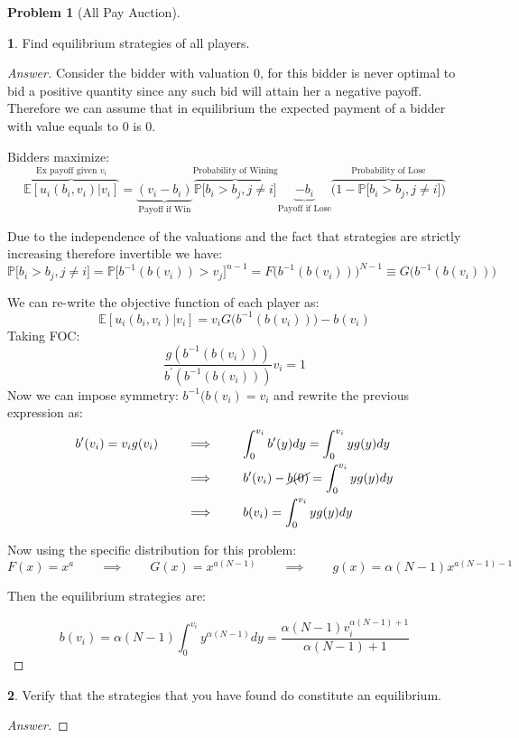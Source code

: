 \documentclass[12pt]{article}
\theoremstyle{definition}
\newtheorem{problem}{Problem}
\newtheorem{subproblem}{}[problem]
\newcommand{\qiq}{\qquad \implies \qquad}
\begin{document}
\begin{problem}[All Pay Auction]
\begin{subproblem}
Find equilibrium strategies of all players.
\end{subproblem}
\begin{proof}[Answer]

Consider the bidder with valuation $0$, for this bidder is never optimal to bid a positive quantity since any such bid will attain her a negative payoff. Therefore we can assume that in equilibrium the expected payment of a bidder with value equals to $0$ is $0$.

Bidders maximize:$$\overbrace{\mathbb{E}[u_i(b_i,v_i)|v_i]}^{\text{Ex payoff given } v_i}=\underbrace{(v_i-b_i)}_{\text{Payoff if Win}} \overbrace{ \mathbb{P}\Big[b_i>b_j, j\neq i\Big]}^{\text{Probability of Wining}}  \underbrace{-b_i}_{\text{Payoff if Lose}} \overbrace{ \Big(1- \mathbb{P}\Big[b_i>b_j, j\neq i\Big]\Big)}^{\text{Probability of Lose}}$$

Due to the independence of the valuations and the fact that strategies are strictly increasing therefore invertible we have:
$$\mathbb{P}\Big[b_i>b_j, j\neq i\Big] = \mathbb{P}\Big[b^{-1}(b(v_i))>v_j\Big]^{n-1} = F\Big(b^{-1}(b(v_i))\Big)^{N-1} \equiv G\Big(b^{-1}(b(v_i))\Big)$$

We can re-write the objective function of each player as:
$$
\mathbb{E}[u_i(b_i,v_i)|v_i]=v_i G\Big(b^{-1}(b(v_i))\Big)- b(v_i)
$$
Taking FOC: 
$$
\frac{g\left(b^{-1}(b(v_i))\right)}{b^{\prime}\left(b^{-1}(b(v_i))\right)}v_i=1
$$
Now we can impose symmetry: $b^{-1}(b(v_i)=v_i$ and rewrite the previous expression as:
\begin{align*}
b'(v_i) = v_ig(v_i) &\qiq \int_0^{v_i}b'(y)dy  = \int_0^{v_i}yg(y)dy\\ &\qiq b'(v_i) - \cancel{b(0)} = \int_0^{v_i}yg(y)dy\\
&\qiq b(v_i) = \int_0^{v_i}yg(y)dy
\end{align*}

Now using the specific distribution for this problem:
$$F(x) = x^a \qiq G(x) = x^{a(N-1)}  \qiq g(x) = \alpha(N-1)x^{a(N-1)-1}$$

Then the equilibrium strategies are:

$$\boxed{b(v_i) = \alpha(N-1)\int_0^{v_i}y^{\alpha(N-1)}dy = \frac{\alpha  (N-1) v_i^{\alpha  (N-1)+1}}{\alpha  (N-1)+1}}$$

\end{proof}
\begin{subproblem}
Verify that the strategies that you have found do constitute an equilibrium.
\end{subproblem}
\begin{proof}[Answer]


\end{proof}
\end{problem}
\end{document}
